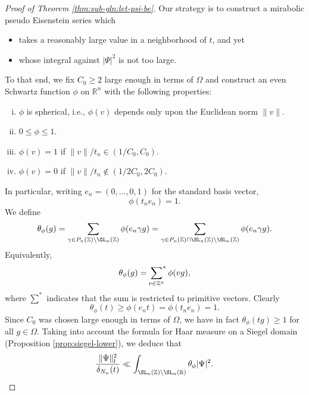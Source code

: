 \begin{proof}[Proof of Theorem \ref{thm:sub-gln:let-psi-be}]
  Our strategy is to construct a mirabolic pseudo Eisenstein series which
  \begin{itemize}
  \item takes a reasonably large value in a neighborhood of $t$, and yet
  \item whose integral against $|\Psi|^2$ is not too large.
  \end{itemize}
  To that end, we fix $C_0 \geq 2$ large enough in terms of $\Omega$ and construct an even Schwartz function $\phi$ on $\mathbb{R}^n$ with the following properties:
  \begin{enumerate}[(i)]
  \item $\phi$ is spherical, i.e., $\phi(v)$ depends only upon the Euclidean norm $\|v\|$.
  \item $0 \leq \phi \leq 1$.
  \item $\phi(v) = 1$ if $\|v\| / t_n \in (1/C_0, C_0)$.
  \item $\phi(v) = 0$ if $\|v\| / t_n \notin (1/2 C_0, 2 C_0)$.
  \end{enumerate}
  In particular, writing $e_n = (0,\dotsc,0,1)$ for the standard basis vector,
  \begin{equation}
    \phi(t_n e_n) = 1.
  \end{equation}
  We define
  \begin{equation*}
    \theta_\phi(g) = \sum_{\gamma \in P_n(\mathbb{Z}) \backslash \GL_n(\mathbb{Z})} \phi(e_n \gamma g)
    =
    \sum_{\gamma \in P_n(\mathbb{Z}) \cap \SL_n(\mathbb{Z}) \backslash \SL_n(\mathbb{Z})} \phi(e_n \gamma g).
  \end{equation*}
  Equivalently,
  \begin{equation*}
    \theta_\phi(g) = \sideset{}{^*}\sum_{v \in \mathbb{Z}^n}\phi(v g),
  \end{equation*}
  where $\sum^*$ indicates that the sum is restricted to primitive vectors.  Clearly
  \begin{equation*}
    \theta_\phi(t) \geq \phi(e_n t) = \phi(t_n e_n) = 1.
  \end{equation*}
  Since $C_0$ was chosen large enough in terms of $\Omega$, we have in fact $\theta_\phi(t g) \geq 1$ for all $g \in \Omega$.  Taking into account the formula for Haar measure on a Siegel domain (Proposition \ref{prop:siegel-lower}), we deduce that
  \begin{equation*}
    \frac{\|\Psi \|_t^2 }{\delta_{N_n}(t)} \ll
    \int_{\SL_n(\mathbb{Z}) \backslash \SL_n(\mathbb{R})} \theta_\phi |\Psi|^2.
  \end{equation*}

\end{proof}
